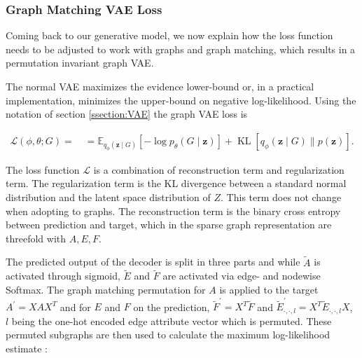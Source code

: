 {\subsubsection{Graph Matching VAE Loss}
\label{ssec3:GVAEloss}
Coming back to our generative model, we now explain how the loss function needs to be adjusted to work with graphs and graph matching, which results in a permutation invariant graph VAE.

The normal VAE maximizes the evidence lower-bound or, in a practical implementation, minimizes the upper-bound on negative log-likelihood. Using the notation of section \ref{ssection:VAE} the graph VAE loss is

\begin{equation}
    \begin{array}{l}
    \mathcal{L}(\phi, \theta ; G)=\quad=\mathbb{E}_{q_{\phi}(\mathbf{z} \mid G)}\left[-\log p_{\theta}(G \mid \mathbf{z})\right]+\operatorname{KL}\left[q_{\phi}(\mathbf{z} \mid G) \| p(\mathbf{z})\right].
    \end{array}
\end{equation}

The loss function $\mathcal{L}$ is a combination of reconstruction term and regularization term. The regularization term is the KL divergence between a standard normal distribution and the latent space distribution of $Z$. This term does not change when adopting to graphs. The reconstruction term is the binary cross entropy between prediction and target, which in the sparse graph representation are threefold with $A, E, F$. 



The predicted output of the decoder is split in three parts and while $\tilde{A}$ is activated through sigmoid, $\tilde{E}$ and $\tilde{F}$ are activated via edge- and nodewise Softmax. The graph matching permutation for $A$ is applied to the target $A^{\prime}=X A X^{T}$ and for $E$ and $F$ on the prediction, $\widetilde{F}^{\prime}=X^{T} \widetilde{F}$ and $\widetilde{E}_{\cdot, \cdot, l}^{\prime}=X^{T} \widetilde{E}_{\cdot, \cdot, l} X$, $l$ being the one-hot encoded edge attribute vector which is permuted. These permuted subgraphs are then used to calculate the maximum log-likelihood estimate \cite{simonovsky_graphvae_2018}:

}
